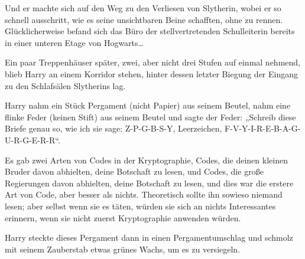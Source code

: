Und er machte sich auf den Weg zu den Verliesen von Slytherin, wobei er so schnell ausschritt, wie es seine unsichtbaren Beine schafften, ohne zu rennen. Glücklicherweise befand sich das Büro der stellvertretenden Schulleiterin bereits in einer unteren Etage von Hogwarts…

Ein paar Treppenhäuser später, zwei, aber nicht drei Stufen auf einmal nehmend, blieb Harry an einem Korridor stehen, hinter dessen letzter Biegung der Eingang zu den Schlafsälen Slytherins lag.

Harry nahm ein Stück Pergament (nicht Papier) aus seinem Beutel, nahm eine flinke Feder (keinen Stift) aus seinem Beutel und sagte der Feder: „Schreib diese Briefe genau so, wie ich sie sage: Z-P-G-B-S-Y, Leerzeichen, F-V-Y-I-R-E-B-A-G-U-R-G-E-R-R“.

Es gab zwei Arten von Codes in der Kryptographie, Codes, die deinen kleinen Bruder davon abhielten, deine Botschaft zu lesen, und Codes, die große Regierungen davon abhielten, deine Botschaft zu lesen, und dies war die erstere Art von Code, aber besser als nichts. Theoretisch sollte ihn sowieso niemand lesen; aber selbst wenn sie es täten, würden sie sich an nichts Interessantes erinnern, wenn sie nicht zuerst Kryptographie anwenden würden.

Harry steckte dieses Pergament dann in einen Pergamentumschlag und schmolz mit seinem Zauberstab etwas grünes Wachs, um es zu versiegeln.

